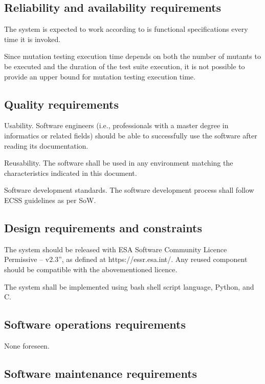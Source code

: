 \subsection{Reliability and availability requirements}

\RQ{} The system is expected to work according to is functional specifications every time it is invoked.

\RQ{} Since mutation testing execution time depends on both the number of mutants to be executed and the duration of the test suite execution, it is not possible to provide an upper bound for mutation testing execution time.

\subsection{Quality requirements}

\RQ{} Usability. Software engineers (i.e., professionals with a master degree in informatics or related fields) should be able to successfully use the software after reading its documentation.

\RQ{} Reusability. The software shall be used in any environment matching the characteristics indicated in this document.

\RQ{} Software development standards. The software development process shall follow ECSS guidelines as per SoW.

\subsection{Design requirements and constraints}

\RQ{} The system should be released with ESA Software Community Licence Permissive – v2.3”, as defined at https://essr.esa.int/. Any reused component should be compatible with the abovementioned licence.

\RQ{} The system shall be implemented using bash shell script language, Python, and C.

\subsection{Software operations requirements}

None foreseen.

\subsection{Software maintenance requirements}

